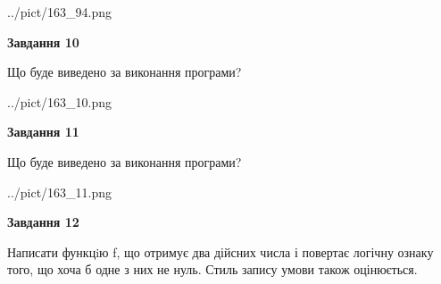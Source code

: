 \documentclass[12pt, ukrainian]{article}
\begin{document}
{\begin {large}
\begin{center}
	{../pict/163_94.png}
\end{center}
\newpage

{\begin {center}\textbf{Завдання 10}\end {center}}

Що буде виведено за виконання програми?\par
\begin{center}
	{../pict/163_10.png}
\end{center}
\newpage

{\begin {center}\textbf{Завдання 11}\end {center}}

Що буде виведено за виконання програми?\par
\begin{center}
	{../pict/163_11.png}
\end{center}
\newpage

{\begin {center}\textbf{Завдання 12}\end {center}}


Написати функцiю f, що отримує два дійсних числа і повертає логічну ознаку того, що хоча б одне з них не нуль. Стиль запису умови також оцінюється.\par
\newpage

\end {large}}
\end{document}
